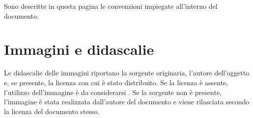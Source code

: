 Sono descritte in questa pagina le convenzioni impiegate all'interno del documento.
\section*{Immagini e didascalie}
Le didascalie delle immagini riportano la sorgente originaria, l'autore dell'oggetto e, se presente, la licenza con cui è stato distribuito. Se la licenza è assente, l'utilizzo dell'immagine è da considerarsi . Se la sorgente non è presente, l'immagine è stata realizzata dall'autore del documento e viene rilasciata secondo la licenza del documento stesso.
